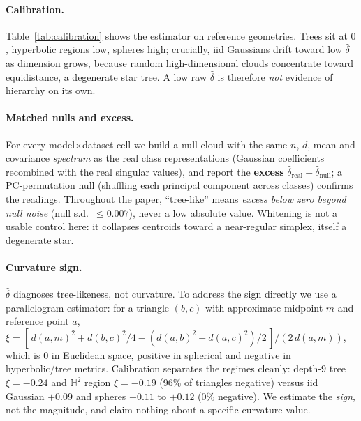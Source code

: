 \documentclass{article} %
\begin{document}
\paragraph{Calibration.} Table~\ref{tab:calibration} shows the estimator on reference geometries. Trees sit at $0$, hyperbolic regions low, spheres high; crucially, iid Gaussians drift toward low $\hat\delta$ as dimension grows, because random high-dimensional clouds concentrate toward equidistance, a degenerate star tree. A low raw $\hat\delta$ is therefore \emph{not} evidence of hierarchy on its own.

\paragraph{Matched nulls and excess.} For every model$\times$dataset cell we build a null cloud with the same $n$, $d$, mean and covariance \emph{spectrum} as the real class representations (Gaussian coefficients recombined with the real singular values), and report the \textbf{excess} $\hat\delta_{\mathrm{real}} - \hat\delta_{\mathrm{null}}$; a PC-permutation null (shuffling each principal component across classes) confirms the readings. Throughout the paper, ``tree-like'' means \emph{excess below zero beyond null noise} (null s.d.\ $\le 0.007$), never a low absolute value. Whitening is not a usable control here: it collapses centroids toward a near-regular simplex, itself a degenerate star.

\paragraph{Curvature sign.} $\hat\delta$ diagnoses tree-likeness, not curvature. To address the sign directly we use a parallelogram estimator: for a triangle $(b,c)$ with approximate midpoint $m$ and reference point $a$, $\xi = [\,d(a,m)^2 + d(b,c)^2/4 - (d(a,b)^2+d(a,c)^2)/2\,]/(2\,d(a,m))$, which is $0$ in Euclidean space, positive in spherical and negative in hyperbolic/tree metrics. Calibration separates the regimes cleanly: depth-9 tree $\xi=-0.24$ and $\mathbb{H}^2$ region $\xi=-0.19$ (96\% of triangles negative) versus iid Gaussian $+0.09$ and spheres $+0.11$ to $+0.12$ (0\% negative). %
We estimate the \emph{sign}, not the magnitude, and claim nothing about a specific curvature value.
\end{document}

